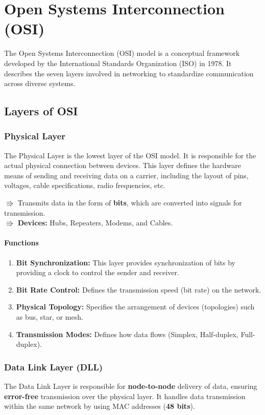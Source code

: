 \chapter{Open Systems Interconnection (OSI)}

The Open Systems Interconnection (OSI) model is a conceptual framework developed by the International Standards Organization (ISO) in 1978. It describes the seven layers involved in networking to standardize communication across diverse systems.

\section{Layers of OSI}

\subsection{Physical Layer}
The Physical Layer is the lowest layer of the OSI model. It is responsible for the actual physical connection between devices. This layer defines the hardware means of sending and receiving data on a carrier, including the layout of pins, voltages, cable specifications, radio frequencies, etc.

$\Rrightarrow$ Transmits data in the form of \textbf{bits}, which are converted into signals for transmission.\\
$\Rrightarrow$ \textbf{Devices:} Hubs, Repeaters, Modems, and Cables.
\subsubsection{Functions}
\begin{enumerate}[itemsep=1ex]
   \item \textbf{Bit Synchronization:}
   This layer provides synchronization of bits by providing a clock to control the sender and receiver.
   \item \textbf{Bit Rate Control:}
   Defines the transmission speed (bit rate) on the network.
   \item \textbf{Physical Topology:}
   Specifies the arrangement of devices (topologies) such as bus, star, or mesh.
   \item \textbf{Transmission Modes:}
   Defines how data flows (Simplex, Half-duplex, Full-duplex).
\end{enumerate}


\vspace{1em}
\subsection{Data Link Layer (DLL)}
The Data Link Layer is responsible for \textbf{node-to-node} delivery of data, ensuring \textbf{error-free} transmission over the physical layer. It handles data transmission within the same network by using MAC addresses (\textbf{48 bits}).

